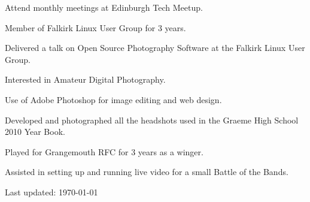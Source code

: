 \documentclass[11pt,a4paper]{article}
\renewenvironment{itemize}{
  \begin{list}{}{
    \setlength{\leftmargin}{1em}
    \setlength{\itemsep}{0.25em}
    \setlength{\parskip}{0pt}
    \setlength{\parsep}{0.25em}
    \renewcommand{\labelitemi}{$\bullet$}
  }
}{
  \end{list}
}
\begin{document}
\begin{itemize}
    \item Attend monthly meetings at Edinburgh Tech Meetup.
    \item Member of Falkirk Linux User Group for 3 years.
    \item Delivered a talk on Open Source Photography Software at the Falkirk
        Linux User Group.
    \item Interested in Amateur Digital Photography.
    \item Use of Adobe Photoshop for image editing and web design.
    \item Developed and photographed all the headshots used in the Graeme High
        School 2010 Year Book.
    \item Played for Grangemouth RFC for 3 years as a winger.
    \item Assisted in setting up and running live video for a small Battle of
        the Bands.
\end{itemize}


\medskip
\begin{center}
  \begin{small}
    Last updated: \today
  \end{small}
\end{center}
\end{document}
